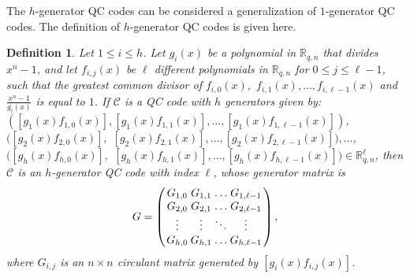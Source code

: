 \documentclass[journal]{IEEEtran}
\newtheorem{definition}{Definition}
\begin{document}

The $h$-generator QC codes can be considered a generalization of $1$-generator QC codes. The definition of $h$-generator QC codes is given here.
\begin{definition}\label{def-h-QC}
	Let  $1 \leq i \leq h$. 
	Let $g_i(x)$ be a polynomial in $\mathbb{R}_{q,n}$ that divides ${{x}^{n}}-1$, and let $f_{i,j}(x)$ be $\ell$ different polynomials in $\mathbb{R}_{q,n}$ for $0\le j\le \ell-1$, such that the greatest common divisor of $f_{i,0}(x),$ $f_{i,1}(x),\ldots,f_{i,{\ell-1}}(x)$ and $\frac{x^n-1}{g_i(x)}$ is equal to $1$.  
	If $\mathscr{C}$ is a QC code with $h$ generators given by:
	$(\left[g_{1}(x) f_{1,0}(x)\right],\left[g_{1}(x) f_{1,1}(x)\right],\ldots,\left[g_{1}(x) f_{1, \ell-1}(x)\right])$, 
	$(\left[g_{2}(x) f_{2,0}(x)\right],$ $\left[g_{2}(x) f_{2,1}(x)\right],\ldots,\left[g_{2}(x) f_{2, \ell-1}(x)\right]),\ldots$, 
	$(\left[g_{h}(x) f_{h, 0}(x)\right],$ $\left[g_{h}(x) f_{h, 1}(x)\right],\ldots,\left[g_{h}(x) f_{h, \ell-1}(x)\right]) \in \mathbb{R}_{q,n}^{\ell} $, then $\mathscr{C}$ is an $h$-generator QC code with index $\ell$, whose generator matrix is
	\begin{equation}\setlength{\arraycolsep}{1.2pt}
		G=\left(\begin{array}{cccc}
			G_{1,0} & G_{1,1} & \ldots & G_{1, \ell-1} \\
			G_{2,0} & G_{2,1} & \ldots & G_{2, \ell-1} \\
			\vdots & \vdots & \ddots & \vdots \\
			G_{h, 0} & G_{h, 1} & \ldots & G_{h, \ell-1}
		\end{array}\right),
	\end{equation}
	where $G_{i, j}$ is an $n \times n$ circulant matrix generated by $\left[g_{i}(x) f_{i, j}(x)\right]$.
\end{definition}
\end{document}
